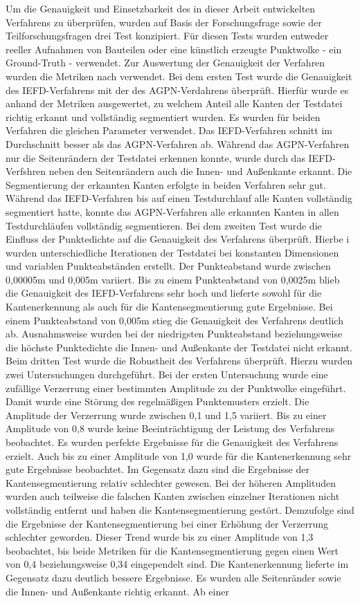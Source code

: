 Um die Genauigkeit und Einsetzbarkeit des in dieser Arbeit entwickelten Verfahrens zu überprüfen, wurden auf Basis der Forschungsfrage sowie der Teilforschungsfragen drei Test konzipiert. Für diesen Tests wurden entweder reeller Aufnahmen von Bauteilen oder eine künstlich erzeugte Punktwolke - ein Ground-Truth - verwendet. Zur Auswertung der Genauigkeit der Verfahren wurden die Metriken nach \autocite[13]{ni_edge_2016} verwendet. Bei dem ersten Test wurde die Genauigkeit des IEFD-Verfahrens mit der des AGPN-Verdahrens überprüft. Hierfür wurde es anhand der Metriken ausgewertet, zu welchem Anteil alle Kanten der Testdatei richtig erkannt und vollständig segmentiert wurden. Es wurden für beiden Verfahren die gleichen Parameter verwendet. Das IEFD-Verfahren schnitt im Durchschnitt besser als das AGPN-Verfahren ab. Während das AGPN-Verfahren nur die Seitenrändern der Testdatei erkennen konnte, wurde durch das IEFD-Verfshren neben den Seitenrändern auch die Innen- und Außenkante erkannt. Die Segmentierung der erkannten Kanten erfolgte in beiden Verfahren sehr gut. Während das IEFD-Verfahren bis auf einen Testdurchlauf alle Kanten vollständig segmentiert hatte, konnte das AGPN-Verfahren alle erkannten Kanten in allen Testdurchläufen vollständig segmentieren. Bei dem zweiten Test wurde die Einfluss der Punktedichte auf die Genauigkeit des Verfahrens überprüft. Hierbe i wurden unterschiedliche Iterationen der Testdatei bei konstanten Dimensionen und variablen Punkteabständen erstellt. Der Punkteabstand wurde zwischen 0,00005m und 0,005m variiert. Bis zu einem Punkteabstand von 0,0025m blieb die Genauigkeit des IEFD-Verfahrens sehr hoch und lieferte sowohl für die Kantenerkennung als auch für die Kantensegmentierung gute Ergebnisse. Bei einem Punkteabstand von 0,005m stieg die Genauigkeit des Verfahrens deutlich ab. Ausnahmsweise wurden bei der niedrigsten Punkteabstand beziehungsweise die höchste Punktedichte die Innen- und Außenkante der Testdatei nicht erkannt. Beim dritten Test wurde die Robustheit des Verfahrens überprüft. Hierzu wurden zwei Untersuchungen durchgeführt. Bei der ersten Untersuchung wurde eine zufällige Verzerrung einer bestimmten Amplitude zu der Punktwolke eingeführt. Damit wurde eine Störung des regelmäßigen Punktemusters erzielt. Die Amplitude der Verzerrung wurde zwischen 0,1 und 1,5 variiert. Bis zu einer Amplitude von 0,8 wurde keine Beeinträchtigung der Leistung des Verfahrens beobachtet. Es wurden perfekte Ergebnisse für die Genauigkeit des Verfahrens erzielt. Auch bis zu einer Amplitude von 1,0 wurde für die Kantenerkennung sehr gute Ergebnisse beobachtet. Im Gegensatz dazu sind die Ergebnisse der Kantensegmentierung relativ schlechter gewesen. Bei der höheren Amplituden wurden auch teilweise die falschen Kanten zwischen einzelner Iterationen nicht vollständig entfernt und haben die Kantensegmentierung gestört. Demzufolge sind die Ergebnisse der Kantensegmentierung bei einer Erhöhung der Verzerrung schlechter geworden. Dieser Trend wurde bis zu einer Amplitude von 1,3 beobachtet, bis beide Metriken für die Kantensegmentierung gegen einen Wert von 0,4 beziehungsweise 0,34 eingependelt sind. Die Kantenerkennung lieferte im Gegensatz dazu deutlich bessere Ergebnisse. Es wurden alle Seitenränder sowie die Innen- und Außenkante richtig erkannt. Ab einer 